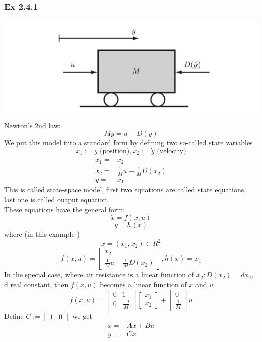 \documentclass[12pt, a4paper]{article}
\begin{document}
\subsubsection*{Ex 2.4.1}
\includegraphics[scale=0.5]{images/EX2_4_1.png}\\
Newton's 2nd law: $$M\ddot y=u-D(\dot y)$$
We put this model into a standard form by defining two so-called state variables
$$x_1:=y \text{ (position)}, x_2:=\dot y \text{ (velocity)}$$
\begin{align*}
    \dot x_1=&x_2\\
    \dot x_2=&\frac{1}{M}u - \frac{1}{M}D(x_2)\\
    y=&x_1
\end{align*}
This is called state-space model, first two equations are called state equations, last one is called output equation.\\
These equations have the general form: $$\dot x=f(x,u)$$ $$y=h(x)$$ where (in this example ) $$x=(x_1,x_2)\in R^2$$ $$f(x,u)=\begin{bmatrix}x_2\\ \frac{1}{M}u-\frac{1}{M}D(x_2)\end{bmatrix}, h(x)=x_1$$
In the special case, where air resistance is a linear function of $x_2:D(x_2)=dx_2$, d real constant, then $f(x,u)$ becomes a linear function of $x$ and $u$
$$f(x,u)=\begin{bmatrix} 0&1\\0&\frac{-d}{M}\end{bmatrix} \begin{bmatrix} x_1\\x_2\end{bmatrix} +\begin{bmatrix} 0\\\frac{1}{M}\end{bmatrix}u$$
Define $C:= \begin{bmatrix}1&0\end{bmatrix}$ we get 
\begin{align*}
    \dot x=&Ax+Bu\\
    y=&Cx
\end{align*}
\end{document}
